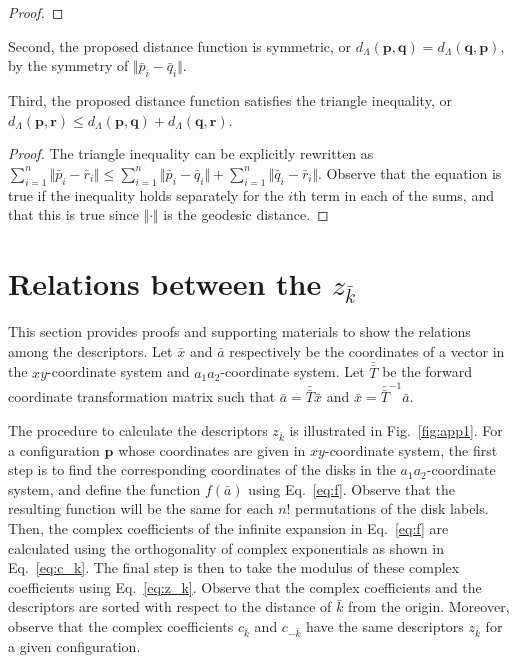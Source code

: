 \documentclass[default,iicol]{sn-jnl}%
\theoremstyle{thmstyleone}%
\theoremstyle{thmstyletwo}%
\theoremstyle{thmstylethree}%
\renewcommand{\vec}[1]{\bar{#1}}
\providecommand{\mat}[1]{\bar{\bar{#1}}}
\providecommand{\config}[1]{\mathbf{#1}}
\begin{document}
\begin{appendices}
\begin{proof}
	\end{proof}
	
	Second, the proposed distance function is symmetric, or $d_\Lambda(\config{p},\config{q}) = d_\Lambda(\config{q},\config{p})$, by the symmetry of $\Vert \vec{p}_i - \vec{q}_i \Vert$.
	
	Third, the proposed distance function satisfies the triangle inequality, or $d_\Lambda(\config{p}, \config{r}) \leq d_\Lambda(\config{p}, \config{q}) + d_\Lambda(\config{q}, \config{r})$.
	\begin{proof}
		The triangle inequality can be explicitly rewritten as $\sum_{i = 1}^n \Vert \vec{p}_i - \vec{r}_i \Vert \leq \sum_{i = 1}^n \Vert \vec{p}_i - \vec{q}_i \Vert + \sum_{i = 1}^n \Vert \vec{q}_i - \vec{r}_i \Vert$. Observe that the equation is true if the inequality holds separately for the $i$th term in each of the sums, and that this is true since $\Vert \cdot \Vert$ is the geodesic distance.
	\end{proof}



	\section{Relations between the $z_{\vec{k}}$}
	\label{sec:descriptor_proofs}
	
	This section provides proofs and supporting materials to show the relations among the descriptors. Let $\vec{x}$ and $\vec{a}$ respectively be the coordinates of a vector in the $xy$-coordinate system and $a_1a_2$-coordinate system. Let $\mat{T}$ be the forward coordinate transformation matrix such that $\vec{a} = \mat{T} \vec{x}$ and $\vec{x} = \mat{T}^{-1} \vec{a}$. 
	
	The procedure to calculate the descriptors $z_{\vec{k}}$ is illustrated in Fig.\ \ref{fig:app1}. For a configuration $\config{p}$ whose coordinates are given in $xy$-coordinate system, the first step is to find the corresponding coordinates of the disks in the $a_1a_2$-coordinate system, and define the function $f(\vec{a})$ using Eq.\ \ref{eq:f}. Observe that the resulting function will be the same for each $n!$ permutations of the disk labels. Then, the complex coefficients of the infinite expansion in Eq.\ \ref{eq:f} are calculated using the orthogonality of complex exponentials as shown in Eq.\ \ref{eq:c_k}. The final step is then to take the modulus of these complex coefficients using Eq.\ \ref{eq:z_k}. Observe that the complex coefficients and the descriptors are sorted with respect to the distance of $\vec{k}$ from the origin. Moreover, observe that the complex coefficients $c_{\vec{k}}$ and $c_{-\vec{k}}$ have the same descriptors $z_{\vec{k}}$ for a given configuration.
	

\end{appendices}
\end{document}
